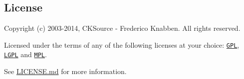 \subsection*{License }

Copyright (c) 2003-\/2014, C\+K\+Source -\/ Frederico Knabben. All rights reserved.

Licensed under the terms of any of the following licenses at your choice\+: \href{http://www.gnu.org/licenses/gpl.html}{\tt G\+P\+L}, \href{http://www.gnu.org/licenses/lgpl.html}{\tt L\+G\+P\+L} and \href{http://www.mozilla.org/MPL/MPL-1.1.html}{\tt M\+P\+L}.

See \hyperlink{LICENSE_8md}{L\+I\+C\+E\+N\+S\+E.\+md} for more information. 